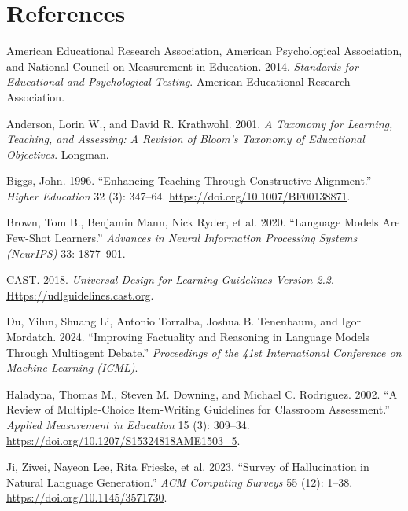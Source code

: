 \documentclass[
  11pt,
  letterpaper,
]{article}
\newlength{\cslhangindent}
\newenvironment{CSLReferences}[2] %
 {\begin{list}{}{%
  \setlength{\itemindent}{0pt}
  \setlength{\leftmargin}{0pt}
  \setlength{\parsep}{0pt}
  \ifodd #1
   \setlength{\leftmargin}{\cslhangindent}
   \setlength{\itemindent}{-1\cslhangindent}
  \fi
  \setlength{\itemsep}{#2\baselineskip}}}
 {\end{list}}
\begin{document}
\section*{References}\label{references}

\protect{}\label{refs}
\begin{CSLReferences}{1}{1}
American Educational Research Association, American Psychological
Association, and National Council on Measurement in Education. 2014.
\emph{Standards for Educational and Psychological Testing}. American
Educational Research Association.

Anderson, Lorin W., and David R. Krathwohl. 2001. \emph{A Taxonomy for
Learning, Teaching, and Assessing: A Revision of Bloom's Taxonomy of
Educational Objectives}. Longman.

Biggs, John. 1996. {``Enhancing Teaching Through Constructive
Alignment.''} \emph{Higher Education} 32 (3): 347--64.
\url{https://doi.org/10.1007/BF00138871}.

{Brown, Tom B., Benjamin Mann, Nick Ryder, et al.} 2020. {``Language
Models Are Few-Shot Learners.''} \emph{Advances in Neural Information
Processing Systems (NeurIPS)} 33: 1877--901.

CAST. 2018. \emph{Universal Design for Learning Guidelines Version 2.2}.
\href{https://udlguidelines.cast.org}{Https://udlguidelines.cast.org}.

Du, Yilun, Shuang Li, Antonio Torralba, Joshua B. Tenenbaum, and Igor
Mordatch. 2024. {``Improving Factuality and Reasoning in Language Models
Through Multiagent Debate.''} \emph{Proceedings of the 41st
International Conference on Machine Learning (ICML)}.

Haladyna, Thomas M., Steven M. Downing, and Michael C. Rodriguez. 2002.
{``A Review of Multiple-Choice Item-Writing Guidelines for Classroom
Assessment.''} \emph{Applied Measurement in Education} 15 (3): 309--34.
\url{https://doi.org/10.1207/S15324818AME1503_5}.

Ji, Ziwei, Nayeon Lee, Rita Frieske, et al. 2023. {``Survey of
Hallucination in Natural Language Generation.''} \emph{ACM Computing
Surveys} 55 (12): 1--38. \url{https://doi.org/10.1145/3571730}.


\end{CSLReferences}
\end{document}
